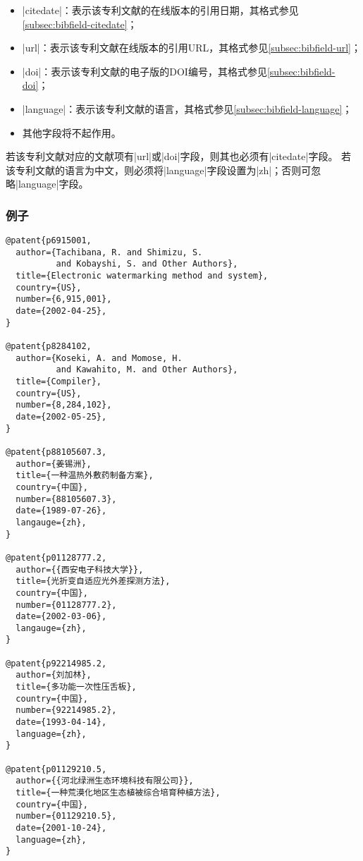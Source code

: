 \begin{itemize}
\item |citedate|：表示该专利文献的在线版本的引用日期，其格式参见\ref{subsec:bibfield-citedate}；
\item |url|：表示该专利文献在线版本的引用URL，其格式参见\ref{subsec:bibfield-url}；
\item |doi|：表示该专利文献的电子版的DOI编号，其格式参见\ref{subsec:bibfield-doi}；
\item |language|：表示该专利文献的语言，其格式参见\ref{subsec:bibfield-language}；
\item 其他字段将不起作用。
\end{itemize}

\begin{note}
若该专利文献对应的文献项有|url|或|doi|字段，则其也必须有|citedate|字段。
若该专利文献的语言为中文，则必须将|language|字段设置为|zh|；否则可忽略|language|字段。
\end{note}

\subsubsection{例子}

\begin{verbatim}
@patent{p6915001,
  author={Tachibana, R. and Shimizu, S. 
          and Kobayshi, S. and Other Authors},
  title={Electronic watermarking method and system},
  country={US},
  number={6,915,001},
  date={2002-04-25},
}

@patent{p8284102,
  author={Koseki, A. and Momose, H. 
          and Kawahito, M. and Other Authors},
  title={Compiler},
  country={US},
  number={8,284,102},
  date={2002-05-25},
}

@patent{p88105607.3,
  author={姜锡洲},
  title={一种温热外敷药制备方案},
  country={中国},
  number={88105607.3},
  date={1989-07-26},
  langauge={zh},
}

@patent{p01128777.2,
  author={{西安电子科技大学}},
  title={光折变自适应光外差探测方法},
  country={中国},
  number={01128777.2},
  date={2002-03-06},
  langauge={zh},
}

@patent{p92214985.2,
  author={刘加林},
  title={多功能一次性压舌板},
  country={中国},
  number={92214985.2},
  date={1993-04-14},
  language={zh},
}

@patent{p01129210.5,
  author={{河北绿洲生态环境科技有限公司}},
  title={一种荒漠化地区生态植被综合培育种植方法},
  country={中国},
  number={01129210.5},
  date={2001-10-24},
  language={zh},
}
\end{verbatim}


